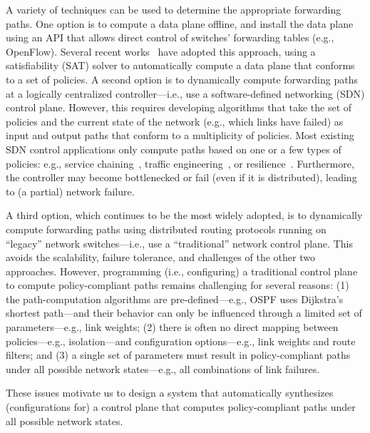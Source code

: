 A variety of techniques can be used to determine the appropriate forwarding
paths. One option is to compute a data plane offline, and install the data
plane using an API that allows direct control of switches' forwarding tables
(e.g., OpenFlow). Several recent works~\cite{netegg} have adopted this
approach, using a satisfiability (SAT) solver to automatically compute a data
plane that conforms to a set of policies.  A second option is to dynamically compute forwarding
paths at a logically centralized controller---i.e., use a software-defined
networking (SDN) control plane. However, this requires developing algorithms
that take the set of policies and the current state of the network (e.g.,
which links have failed) as input and output paths that conform to a
multiplicity of policies.  Most existing SDN control applications only compute
paths based on one or a few types of policies: e.g., service
chaining~\cite{simple, flowtags}, traffic engineering~\cite{swan, b4}, or
resilience~\cite{brent}. Furthermore, the controller may become bottlenecked
or fail (even if it is distributed), leading to (a partial) network failure.

A third option, which continues to be the most widely adopted, is to
dynamically compute forwarding paths using distributed routing protocols
running on ``legacy'' network switches---i.e., use a ``traditional'' network
control plane. This avoids the scalability, failure tolerance, and  challenges of the other two approaches. However, programming (i.e.,
configuring) a traditional control plane to compute policy-compliant paths
remains challenging for several reasons: (1) the path-computation algorithms
are pre-defined---e.g., OSPF uses Dijkstra's shortest path---and their
behavior can only be influenced through a limited set of parameters---e.g.,
link weights; (2) there is often no direct mapping between policies---e.g.,
isolation---and configuration options---e.g., link weights and route filters;
and (3) a single set of parameters must result in policy-compliant paths under
all possible network states---e.g., all combinations of link failures.

These issues motivate us to design a system that automatically synthesizes
(configurations for) a control plane that computes policy-compliant paths
under all possible network states.


